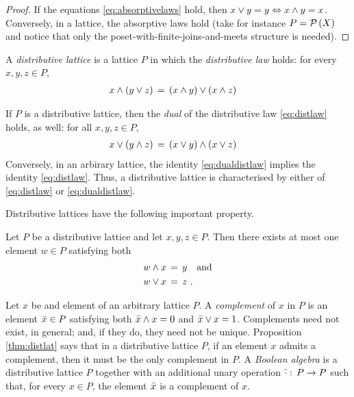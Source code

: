 \begin{proof}
	If the equations \eqref{eq:absorptivelaws} hold, then
	$x\vee y=y\Leftrightarrow x\wedge y=x$. Conversely, in a
	lattice, the absorptive laws hold (take for instance $P=\mathcal{P}\left(X\right)$
	and notice that only the poset-with-finite-joins-and-meets structure
	is needed).
\end{proof}

A \emph{distributive lattice} is a lattice $P$ in which the
\emph{distributive law} holds: for every $x,y,z\in P$,
\begin{equation}
	\label{eq:distlaw}
	\begin{aligned}
		x\wedge (y\vee z) & \,=\,
			(x\wedge y)\vee (x\wedge z)
	\end{aligned}
\end{equation}

\begin{lemmaDualDistLaw}\label{thm:dualdistlaw}
	If $P$ is a distributive lattice, then the \emph{dual} of the
	distributive law \eqref{eq:distlaw} holds, as well:
	for all $x,y,z\in P$,
	\begin{equation}
		\label{eq:dualdistlaw}
		\begin{aligned}
			x\vee (y\wedge z) & \,=\,
				(x\vee y)\wedge (x\vee z)
		\end{aligned}
	\end{equation}
	Conversely, in an arbirary lattice, the identity
	\eqref{eq:dualdistlaw} implies the identity \eqref{eq:distlaw}.
	Thus, a distributive lattice is characterised by either of
	\eqref{eq:distlaw} or \eqref{eq:dualdistlaw}.
\end{lemmaDualDistLaw}

Distributive lattices have the following important property.

\begin{propoDistLat}\label{thm:distlat}
	Let $P$ be a distributive lattice and let $x,y,z\in P$. Then there
	exists at most one element $w\in P$ satisfying both
	\begin{align*}
		w\wedge x & \,=\, y\quad\text{and} \\
		w\vee x & \,=\, z\text{ .}
	\end{align*}
\end{propoDistLat}

Let $x$ be and element of an arbitrary lattice $P$. A \emph{complement} of
$x$ in $P$ is an element $\bar{x}\in P$ satisfying both
$\bar{x}\wedge x=0$ and $\bar{x}\vee x=1$. Complements need not
exist, in general; and, if they do, they need not be unique. Proposition
\ref{thm:distlat} says that in a distributive lattice $P$, if an element $x$
admits a complement, then it must be the only complement in $P$. A
\emph{Boolean algebra} is a distributive lattice $P$ together with an
additional unary operation $\bar{\cdot}:\,P\rightarrow P$ such that,
for every $x\in P$, the element $\bar{x}$ is a complement of $x$.

